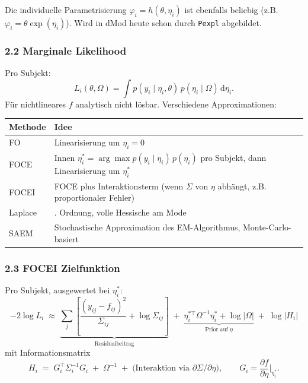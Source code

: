 \documentclass[
]{article}
\newcounter{none} %
\begin{document}
Die individuelle Parametrisierung \(\varphi_i = h(\theta, \eta_i)\) ist
ebenfalls beliebig (z.B. \(\varphi_i = \theta \exp(\eta_i)\)). Wird in
dMod heute schon durch \texttt{Pexpl} abgebildet.

\subsubsection{2.2 Marginale Likelihood}\label{marginale-likelihood}

Pro Subjekt: \[
L_i(\theta, \Omega) = \int p(y_i \mid \eta_i, \theta)\, p(\eta_i \mid \Omega)\, \mathrm{d}\eta_i.
\] Für nichtlineares \(f\) analytisch nicht lösbar. Verschiedene
Approximationen:

{\def\LTcaptype{none} %
\begin{longtable}[]{@{}
  >{\raggedright\arraybackslash}p{}
  >{\raggedright\arraybackslash}p{}@{}}
\toprule\noalign{}
\begin{minipage}[b]{\linewidth}\raggedright
Methode
\end{minipage} & \begin{minipage}[b]{\linewidth}\raggedright
Idee
\end{minipage} \\
\midrule\noalign{}
\endhead
\bottomrule\noalign{}
\endlastfoot
FO & Linearisierung um \(\eta_i = 0\) \\
FOCE & Innen \(\eta_i^* = \arg\max p(y_i\mid\eta_i)\,p(\eta_i)\) pro
Subjekt, dann Linearisierung um \(\eta_i^*\) \\
FOCEI & FOCE plus Interaktionsterm (wenn \(\Sigma\) von \(\eta\)
abhängt, z.B. proportionaler Fehler) \\
Laplace & 2. Ordnung, volle Hessische am Mode \\
SAEM & Stochastische Approximation des EM-Algorithmus,
Monte-Carlo-basiert \\
\end{longtable}
}

\subsubsection{2.3 FOCEI Zielfunktion}\label{focei-zielfunktion}

Pro Subjekt, ausgewertet bei \(\eta_i^*\): \[
-2\log L_i \;\approx\; \underbrace{\sum_j \!\left[\frac{(y_{ij} - f_{ij})^2}{\Sigma_{ij}} + \log \Sigma_{ij}\right]}_{\text{Residualbeitrag}}
\;+\; \underbrace{\eta_i^{*\top} \Omega^{-1} \eta_i^* + \log|\Omega|}_{\text{Prior auf } \eta}
\;+\; \log|H_i|
\] mit Informationsmatrix \[
H_i \;=\; G_i^\top \Sigma_i^{-1} G_i \;+\; \Omega^{-1} \;+\; \text{(Interaktion via } \partial \Sigma / \partial \eta\text{)}, \qquad
G_i = \frac{\partial f}{\partial \eta}\bigg|_{\eta_i^*}.
\]
\end{document}
